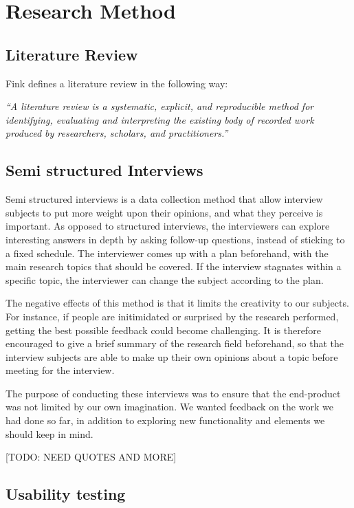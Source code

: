 \chapter{Research Method}
\label{sec:researchmethod}


\section{Literature Review}
Fink\cite{fink2013conducting} defines a literature review in the following way:

\textit{``A literature review is a systematic, explicit, and reproducible method for identifying, evaluating and interpreting the existing body of recorded work produced by researchers, scholars, and practitioners.''}\cite{fink2013conducting}


\section{Semi structured Interviews}

Semi structured interviews is a data collection method that allow interview subjects to put more weight upon their opinions, and what they perceive is important. As opposed to structured interviews, the interviewers can explore interesting answers in depth by asking follow-up questions, instead of sticking to a fixed schedule. The interviewer comes up with a plan beforehand, with the main research topics that should be covered. If the interview stagnates within a specific topic, the interviewer can change the subject according to the plan.

The negative effects of this method is that it limits the creativity to our subjects. For instance, if people are initimidated or surprised by the research performed, getting the best possible feedback could become challenging. It is therefore encouraged to give a brief summary of the research field beforehand, so that the interview subjects are able to make up their own opinions about a topic before meeting for the interview.   

The purpose of conducting these interviews was to ensure that the end-product was not limited by our own imagination. We wanted feedback on the work we had done so far, in addition to exploring new functionality and elements we should keep in mind.

[TODO: NEED QUOTES AND MORE]

\section{Usability testing}


